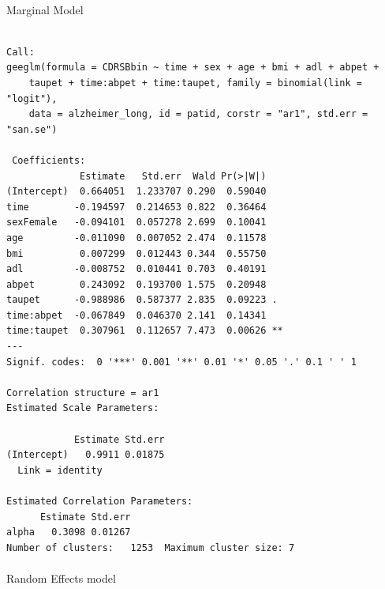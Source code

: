 \documentclass[
  11pt,
  letterpaper,
  DIV=11,
  numbers=noendperiod]{scrartcl}
\makeatletter
\let\oldparagraph\paragraph
\renewcommand{\paragraph}{
    \@ifstar
      \xxxParagraphStar
      \xxxParagraphNoStar
  }
\newcommand{\xxxParagraphStar}[1]{\oldparagraph*{#1}\mbox{}}
\newcommand{\xxxParagraphNoStar}[1]{\oldparagraph{#1}\mbox{}}
\makeatother
\begin{document}
\paragraph{Marginal Model}\label{marginal-model}

\begin{verbatim}

Call:
geeglm(formula = CDRSBbin ~ time + sex + age + bmi + adl + abpet + 
    taupet + time:abpet + time:taupet, family = binomial(link = "logit"), 
    data = alzheimer_long, id = patid, corstr = "ar1", std.err = "san.se")

 Coefficients:
             Estimate   Std.err  Wald Pr(>|W|)   
(Intercept)  0.664051  1.233707 0.290  0.59040   
time        -0.194597  0.214653 0.822  0.36464   
sexFemale   -0.094101  0.057278 2.699  0.10041   
age         -0.011090  0.007052 2.474  0.11578   
bmi          0.007299  0.012443 0.344  0.55750   
adl         -0.008752  0.010441 0.703  0.40191   
abpet        0.243092  0.193700 1.575  0.20948   
taupet      -0.988986  0.587377 2.835  0.09223 . 
time:abpet  -0.067849  0.046370 2.141  0.14341   
time:taupet  0.307961  0.112657 7.473  0.00626 **
---
Signif. codes:  0 '***' 0.001 '**' 0.01 '*' 0.05 '.' 0.1 ' ' 1

Correlation structure = ar1 
Estimated Scale Parameters:

            Estimate Std.err
(Intercept)   0.9911 0.01875
  Link = identity 

Estimated Correlation Parameters:
      Estimate Std.err
alpha   0.3098 0.01267
Number of clusters:   1253  Maximum cluster size: 7 
\end{verbatim}

\paragraph{Random Effects model}\label{random-effects-model}
\end{document}
